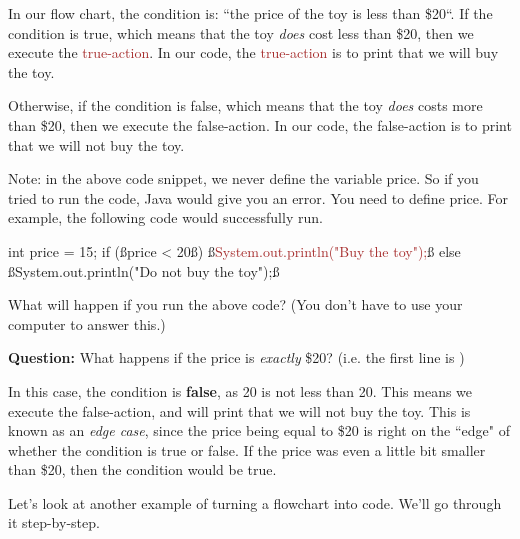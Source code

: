 In our flow chart, the \textcolor{mygreen}{condition} is: ``the price of the toy is less than \$20``. If the \textcolor{mygreen}{condition} is true, which means that the toy \emph{does} cost less than \$20, then we execute the \textcolor{Brown}{true-action}. In our code, the \textcolor{Brown}{true-action} is to print that we will buy the toy.

Otherwise, if the \textcolor{mygreen}{condition} is false, which means that the toy \emph{does} costs more than \$20, then we execute the \textcolor{Rhodamine}{false-action}. In our code, the \textcolor{Rhodamine}{false-action} is to print that we will not buy the toy.

Note: in the above code snippet, we never define the variable \textcolor{mygreen}{price}. So if you tried to run the code, Java would give you an error. You need to define \textcolor{mygreen}{price}. For example, the following code would successfully run.

\begin{code}
int price = 15;
if (ß\textcolor{mygreen}{price < 20}ß) 
{
    ß\textcolor{Brown}{System.out.println("Buy the toy");}ß
}
else
{
    ß\textcolor{Rhodamine}{System.out.println("Do not buy the toy");}ß
}
\end{code}

\begin{exercise}
What will happen if you run the above code? (You don't have to use your computer to answer this.)
\end{exercise}

\noindent \textbf{Question: } What happens if the price is \emph{exactly} \$20? (i.e. the first line is )

In this case, the \textcolor{mygreen}{condition} is \textbf{false}, as 20 is not less than 20. This means we execute the \textcolor{Rhodamine}{false-action}, and will print that we will not buy the toy.
This is known as an \emph{edge case}, since the price being equal to \$20 is right on the ``edge" of whether the \textcolor{mygreen}{condition} is true or false. If the price was even a little bit smaller than \$20, then the \textcolor{mygreen}{condition} would be true.

Let's look at another example of turning a flowchart into code. We'll go through it step-by-step.


